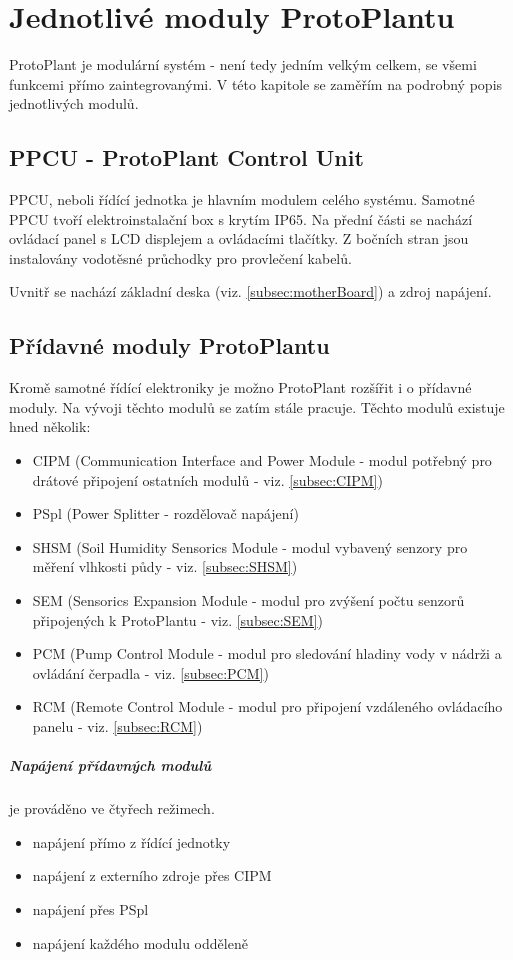\chapter{Jednotlivé moduly ProtoPlantu}
ProtoPlant je modulární systém - není tedy jedním velkým celkem, se všemi funkcemi přímo zaintegrovanými.
V této kapitole se zaměřím na podrobný popis jednotlivých modulů.
\section{PPCU - ProtoPlant Control Unit}
PPCU, neboli řídící jednotka je hlavním modulem celého systému.
Samotné PPCU tvoří elektroinstalační box s krytím IP65.
Na přední části se nachází ovládací panel s LCD displejem a ovládacími tlačítky.
Z bočních stran jsou instalovány vodotěsné průchodky pro provlečení kabelů.

Uvnitř se nachází základní deska (viz. \autoref{subsec:motherBoard}) a zdroj napájení.

\section{Přídavné moduly ProtoPlantu}
Kromě samotné řídící elektroniky je možno ProtoPlant rozšířit i o přídavné moduly. 
Na vývoji těchto modulů se zatím stále pracuje.
Těchto modulů existuje hned několik:

\begin{itemize}
    \item CIPM (Communication Interface and Power Module  - modul potřebný pro drátové připojení ostatních modulů - viz. \autoref{subsec:CIPM})
    \item PSpl (Power Splitter - rozdělovač napájení)
    \item SHSM (Soil Humidity Sensorics Module - modul vybavený senzory pro měření vlhkosti půdy - viz. \autoref{subsec:SHSM})
    \item SEM (Sensorics Expansion Module - modul pro zvýšení počtu senzorů připojených k ProtoPlantu - viz. \autoref{subsec:SEM})
    \item PCM (Pump Control Module - modul pro sledování hladiny vody v nádrži a ovládání čerpadla - viz. \autoref{subsec:PCM})
    \item RCM (Remote Control Module - modul pro připojení vzdáleného ovládacího panelu - viz. \autoref{subsec:RCM})
\end{itemize}

\paragraph{Napájení přídavných modulů}
je prováděno ve čtyřech režimech.
\begin{itemize}
    \item napájení přímo z řídící jednotky
    \item napájení z externího zdroje přes CIPM
    \item napájení přes PSpl
    \item napájení každého modulu odděleně
\end{itemize}

